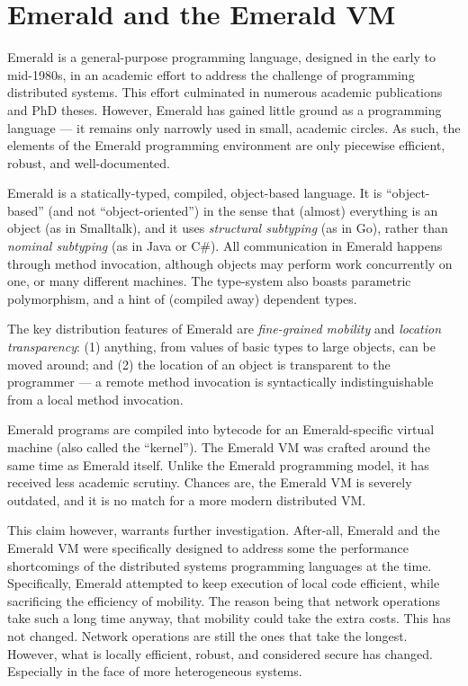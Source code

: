 \chapter{Emerald and the Emerald VM}

Emerald is a general-purpose programming language, designed in the
early to mid-1980s, in an academic effort to address the challenge of
programming distributed systems. This effort culminated in numerous
academic publications\cite{emerald:tse:1987, emerald:tocs:1988,
emerald:spe:1991} and PhD theses\cite{emerald:phd:norman-c-hutchinson,
emerald:phd:eric-jul, emerald:phd:niels-christian-juul}. However,
Emerald has gained little ground as a programming language --- it
remains only narrowly used in small, academic circles. As such, the
elements of the Emerald programming environment are only piecewise
efficient, robust, and well-documented.

Emerald is a statically-typed, compiled, object-based
language\cite{emerald:tse:1987, emerald:tocs:1988, emerald:spe:1991}.
It is ``object-based'' (and not ``object-oriented'') in the sense that
(almost) everything is an object (as in Smalltalk), and it uses
\emph{structural subtyping} (as in Go), rather than \emph{nominal
subtyping} (as in Java or C\#). All communication in Emerald happens
through method invocation, although objects may perform work
concurrently on one, or many different machines. The type-system also
boasts parametric polymorphism, and a hint of (compiled away)
dependent types.

The key distribution features of Emerald are \emph{fine-grained
mobility} and \emph{location transparency}: (1) anything, from values
of basic types to large objects, can be moved around; and (2) the
location of an object is transparent to the programmer --- a remote
method invocation is syntactically indistinguishable from a local
method invocation.

Emerald programs are compiled into bytecode for an Emerald-specific
virtual machine (also called the
``kernel''\cite{emerald:phd:eric-jul}). The Emerald VM was crafted
around the same time as Emerald itself.  Unlike the Emerald
programming model, it has received less academic scrutiny. Chances
are, the Emerald VM is severely outdated, and it is no match for a
more modern distributed VM.

This claim however, warrants further investigation. After-all, Emerald
and the Emerald VM were specifically designed to address some the
performance shortcomings of the distributed systems programming
languages at the time\cite{emerald:phd:eric-jul}. Specifically,
Emerald attempted to keep execution of local code efficient, while
sacrificing the efficiency of mobility. The reason being that network
operations take such a long time anyway, that mobility could take the
extra costs. This has not changed. Network operations are still the
ones that take the longest. However, what is locally efficient,
robust, and considered secure has changed. Especially in the face of
more heterogeneous systems.


